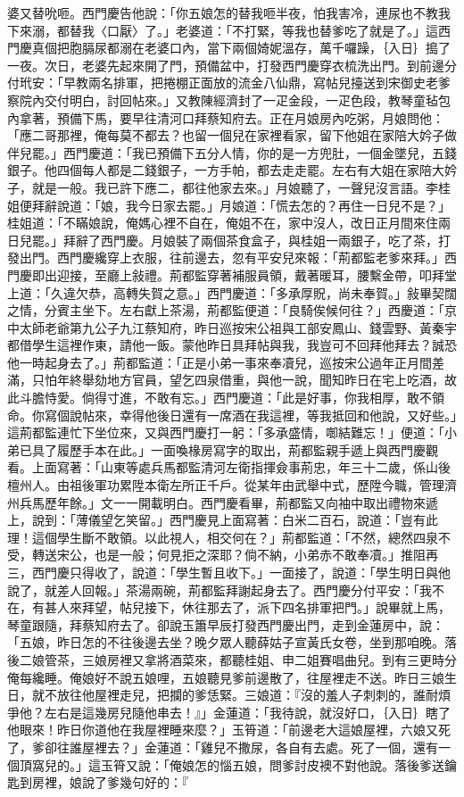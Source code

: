 婆又替吮咂。西門慶告他說：「你五娘怎的替我咂半夜，怕我害冷，連尿也不教我下來溺，都替我〈口厭〉了。」老婆道：「不打緊，等我也替爹吃了就是了。」這西門慶真個把胞膈尿都溺在老婆口內，當下兩個婍妮溫存，萬千囉躁，｛入日｝搗了一夜。次日，老婆先起來開了門，預備盆中，打發西門慶穿衣梳洗出門。到前邊分付玳安：「早教兩名排軍，把捲棚正面放的流金八仙鼎，寫帖兒擡送到宋御史老爹察院內交付明白，討回帖來。」又教陳經濟封了一疋金段，一疋色段，教琴童毡包內拿著，預備下馬，要早往清河口拜蔡知府去。正在月娘房內吃粥，月娘問他：「應二哥那裡，俺每莫不都去？也留一個兒在家裡看家，留下他姐在家陪大妗子做伴兒罷。」西門慶道：「我已預備下五分人情，你的是一方兜肚，一個金墜兒，五錢銀子。他四個每人都是二錢銀子，一方手帕，都去走走罷。左右有大姐在家陪大妗子，就是一般。我已許下應二，都往他家去來。」月娘聽了，一聲兒沒言語。李桂姐便拜辭說道：「娘，我今日家去罷。」月娘道：「慌去怎的？再住一日兒不是？」桂姐道：「不瞞娘說，俺媽心裡不自在，俺姐不在，家中沒人，改日正月間來住兩日兒罷。」拜辭了西門慶。月娘裝了兩個茶食盒子，與桂姐一兩銀子，吃了茶，打發出門。西門慶纔穿上衣服，往前邊去，忽有平安兒來報：「荊都監老爹來拜。」西門慶即出迎接，至廳上敍禮。荊都監穿著補服員領，戴著暖耳，腰繫金帶，叩拜堂上道：「久違欠恭，高轉失賀之意。」西門慶道：「多承厚貺，尚未奉賀。」敍畢契闊之情，分賓主坐下。左右獻上茶湯，荊都監便道：「良騎俟候何往？」西慶道：「京中太師老爺第九公子九江蔡知府，昨日巡按宋公祖與工部安鳳山、錢雲野、黃秦宇都借學生這裡作東，請他一飯。蒙他昨日具拜帖與我，我豈可不回拜他拜去？誠恐他一時起身去了。」荊都監道：「正是小弟一事來奉凟兒，巡按宋公過年正月間差滿，只怕年終舉劾地方官員，望乞四泉借重，與他一說，聞知昨日在宅上吃酒，故此斗膽恃愛。倘得寸進，不敢有忘。」西門慶道：「此是好事，你我相厚，敢不領命。你寫個說帖來，幸得他後日還有一席酒在我這裡，等我抵回和他說，又好些。」這荊都監連忙下坐位來，又與西門慶打一躬：「多承盛情，啣結難忘！」便道：「小弟已具了履歷手本在此。」一面喚椽房寫字的取出，荊都監親手遞上與西門慶觀看。上面寫著：「山東等處兵馬都監清河左衛指揮僉事荊忠，年三十二歲，係山後檀州人。由祖後軍功累陞本衛左所正千戶。從某年由武舉中式，歷陞今職，管理濟州兵馬歷年餘。」文一一開載明白。西門慶看畢，荊都監又向袖中取出禮物來遞上，說到：「薄儀望乞笑留。」西門慶見上面寫著：白米二百石，說道：「豈有此理！這個學生斷不敢領。以此視人，相交何在？」荊都監道：「不然，總然四泉不受，轉送宋公，也是一般；何見拒之深耶？倘不納，小弟赤不敢奉凟。」推阻再三，西門慶只得收了，說道：「學生暫且收下。」一面接了，說道：「學生明日與他說了，就差人回報。」茶湯兩碗，荊都監拜謝起身去了。西門慶分付平安：「我不在，有甚人來拜望，帖兒接下，休往那去了，派下四名排軍把門。」說畢就上馬，琴童跟隨，拜蔡知府去了。卻說玉簫早辰打發西門慶出門，走到金蓮房中，說：「五娘，昨日怎的不往後邊去坐？晚夕眾人聽薛姑子宣黃氏女卷，坐到那咱晚。落後二娘管茶，三娘房裡又拿將酒菜來，都聽桂姐、申二姐賽唱曲兒。到有三更時分俺每纔睡。俺娘好不說五娘哩，五娘聽見爹前邊散了，往屋裡走不送。昨日三娘生日，就不放往他屋裡走兒，把攔的爹恁緊。三娘道：『沒的羞人子刺刺的，誰耐煩爭他？左右是這幾房兒隨他串去！』」金蓮道：「我待說，就沒好口，｛入日｝瞎了他眼來！昨日你道他在我屋裡睡來麼？」玉筲道：「前邊老大這娘屋裡，六娘又死了，爹卻往誰屋裡去？」金蓮道：「雞兒不撒尿，各自有去處。死了一個，還有一個頂窩兒的。」這玉筲又說：「俺娘怎的惱五娘，問爹討皮襖不對他說。落後爹送鑰匙到房裡，娘說了爹幾句好的：『